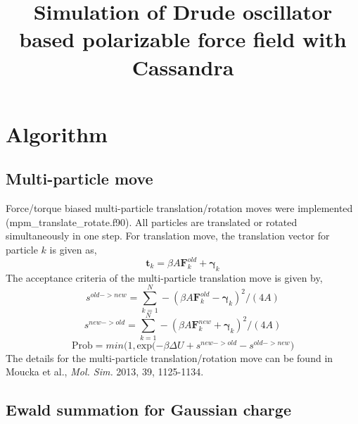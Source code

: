 \documentclass[12pt]{article}
\title{\textbf{Simulation of Drude oscillator based polarizable force field with Cassandra}}
\date{}
\begin{document}
\maketitle 
\section{Algorithm}
\subsection{Multi-particle move}
Force/torque biased multi-particle translation/rotation moves were implemented (mpm\_translate\_rotate.f90). All particles are translated or rotated simultaneously in one step. For translation move, the translation vector for particle $k$ is given as,
\begin{equation}
\boldsymbol{t}_{k} = \beta A \boldsymbol{F}_{k}^{old} + \boldsymbol{\gamma}_{k}
\end{equation}
 The acceptance criteria of the multi-particle translation move is given by,\\
\begin{equation}
 s^{old->new} = \sum_{k=1}^{N} -(\beta A \boldsymbol{F}_{k}^{old} - \boldsymbol{\gamma}_{k} )^2/(4A)
\end{equation}
\begin{equation}
 s^{new->old} = \sum_{k=1}^{N} -(\beta A \boldsymbol{F}_{k}^{new} + \boldsymbol{\gamma}_{k} )^2/(4A)
\end{equation}
\begin{equation}
  \mathrm{Prob} = min \big( 1,\mathrm{exp}(-\beta \Delta U + s^{new->old} - s^{old->new} \big)
\end{equation}
The details for the multi-particle translation/rotation move can be found in Moucka et al., {\it Mol. Sim.} 2013, 39, 1125-1134. 
\subsection{Ewald summation for Gaussian charge} 
\end{document}

